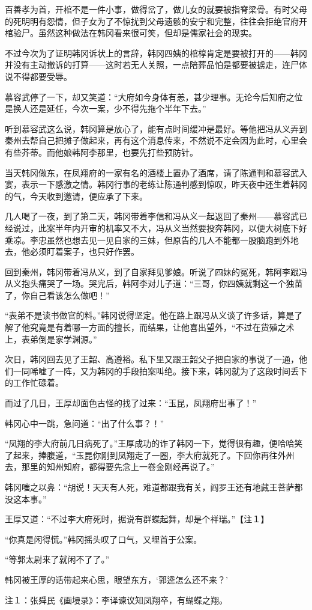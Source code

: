 百善孝为首，开棺不是一件小事，做得岔了，做儿女的就要被指脊梁骨。有时父母的死明明有怨情，但子女为了不惊扰到父母遗骸的安宁和完整，往往会拒绝官府开棺验尸。虽然这种做法在韩冈看来很可笑，但却是儒家社会的现实。

不过今次为了证明韩冈诉状上的言辞，韩冈四姨的棺椁肯定是要被打开的——韩冈并没有主动撤诉的打算——这时若无人关照，一点陪葬品怕是都要被掳走，连尸体说不得都要受辱。

慕容武停了一下，却又笑道：“大府如今身体有恙，甚少理事。无论今后知府之位是换人还是延任，今次一案，少不得先拖个半年下去。”

听到慕容武这么说，韩冈算是放心了，能有点时间缓冲是最好。等他把冯从义弄到秦州去帮自己把摊子做起来，再有这个消息传来，不然说不定会因为此时，心里会有些芥蒂。而他娘韩阿李那里，也要先打些预防针。

当天韩冈做东，在凤翔府的一家有名的酒楼上置办了酒席，请了陈通判和慕容武入宴，表示一下感激之情。韩冈行事的老练让陈通判感到惊叹，昨天夜中还生着韩冈的气，今天收到邀请，便应承了下来。

几人喝了一夜，到了第二天，韩冈带着李信和冯从义一起返回了秦州——慕容武已经说过，此案半年内开审的机率又不大，冯从义当然要投奔韩冈，以便大树底下好乘凉。李忠虽然也想去见一见自家的三妹，但原告的几人不能都一股脑跑到外地去，他必须盯着案子，也只好作罢。

回到秦州，韩冈带着冯从义，到了自家拜见爹娘。听说了四妹的冤死，韩阿李跟冯从义抱头痛哭了一场。哭完后，韩阿李对儿子道：“三哥，你四姨就剩这一个独苗了，你自己看该怎么做吧！”

“表弟不是读书做官的料。”韩冈说得坚定。他在路上跟冯从义谈了许多话，算是了解了他究竟是有着哪一方面的擅长，而结果，让他喜出望外，“不过在货殖之术上，表弟倒是家学渊源。”

次日，韩冈回去见了王韶、高遵裕。私下里又跟王韶父子把自家的事说了一通，他们一同唏嘘了一阵，又为韩冈的手段拍案叫绝。接下来，韩冈就为了这段时间丢下的工作忙碌着。

而过了几日，王厚却面色古怪的找了过来：“玉昆，凤翔府出事了！”

韩冈心中一跳，急问道：“出了什么事？！”

“凤翔的李大府前几日病死了。”王厚成功的诈了韩冈一下，觉得很有趣，便哈哈笑了起来，捧腹道，“玉昆你刚到凤翔走了一圈，李大府就死了。下回你再往外州去，那里的知州知府，都得要先念上一卷金刚经再说了。”

韩冈嗤之以鼻：“胡说！天天有人死，难道都跟我有关，阎罗王还有地藏王菩萨都没这本事。”

王厚又道：“不过李大府死时，据说有群蝶起舞，却是个祥瑞。”【注１】

“你真是闲得慌。”韩冈摇头叹了口气，又埋首于公案。

“等郭太尉来了就闲不了了。”

韩冈被王厚的话带起来心思，眼望东方，‘郭逵怎么还不来？’

注１：张舜民《画墁录》：李译谏议知凤翔卒，有蝴蝶之翔。

